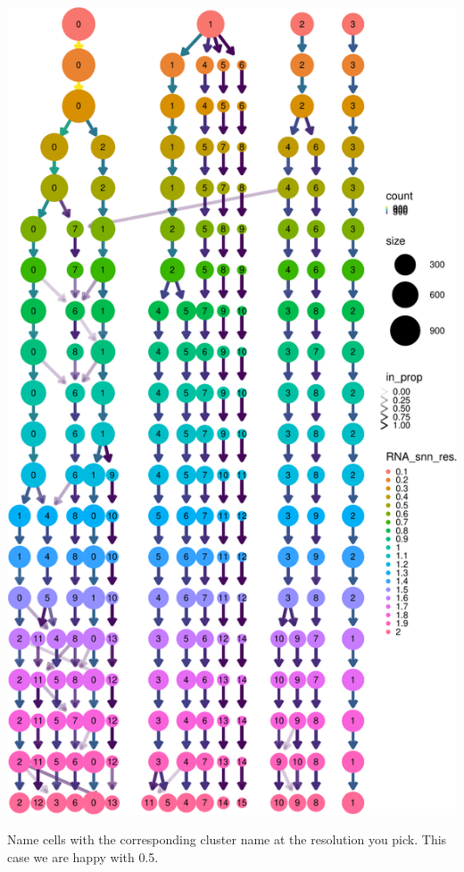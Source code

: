 \documentclass[
]{book}
\newenvironment{Shaded}{\begin{snugshade}}{\end{snugshade}}
\newcommand{\CommentTok}[1]{\textcolor[rgb]{0.56,0.35,0.01}{\textit{#1}}}
\newcommand{\FloatTok}[1]{\textcolor[rgb]{0.00,0.00,0.81}{#1}}
\newcommand{\FunctionTok}[1]{\textcolor[rgb]{0.13,0.29,0.53}{\textbf{#1}}}
\newcommand{\NormalTok}[1]{#1}
\newcommand{\OtherTok}[1]{\textcolor[rgb]{0.56,0.35,0.01}{#1}}
\newcommand{\SpecialCharTok}[1]{\textcolor[rgb]{0.81,0.36,0.00}{\textbf{#1}}}
\begin{document}
\includegraphics{scRNAseqInR_Doco_files/figure-latex/unnamed-chunk-25-1.pdf}

Name cells with the corresponding cluster name at the resolution you pick. This case we are happy with 0.5.

\begin{Shaded}
\end{Shaded}
\end{document}
